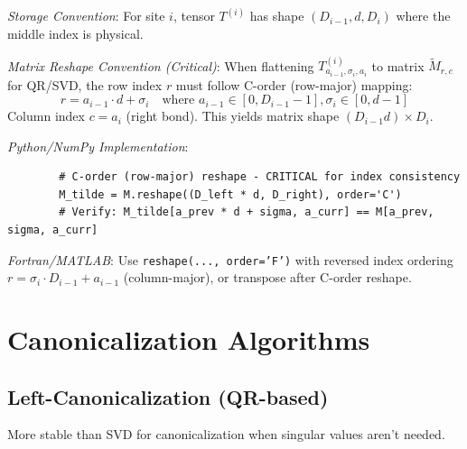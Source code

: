 \documentclass[aps,prb,onecolumn,scriptaddress]{revtex4-2}
\begin{document}
	\textit{Storage Convention}: For site $i$, tensor $T^{(i)}$ has shape $(D_{i-1}, d, D_i)$ where the middle index is physical.
	
	\textit{Matrix Reshape Convention (Critical)}: When flattening $T^{(i)}_{a_{i-1},\sigma_i,a_i}$ to matrix $\tilde{M}_{r,c}$ for QR/SVD, the row index $r$ must follow C-order (row-major) mapping:
	\begin{equation}
		r = a_{i-1} \cdot d + \sigma_i \quad \text{where } a_{i-1} \in [0,D_{i-1}-1], \sigma_i \in [0,d-1]
	\end{equation}
	Column index $c = a_i$ (right bond). This yields matrix shape $(D_{i-1}d) \times D_i$.
	
	\textit{Python/NumPy Implementation}:
	\begin{verbatim}
		# C-order (row-major) reshape - CRITICAL for index consistency
		M_tilde = M.reshape((D_left * d, D_right), order='C')
		# Verify: M_tilde[a_prev * d + sigma, a_curr] == M[a_prev, sigma, a_curr]
	\end{verbatim}
	\textit{Fortran/MATLAB}: Use \texttt{reshape(..., order='F')} with reversed index ordering $r = \sigma_i \cdot D_{i-1} + a_{i-1}$ (column-major), or transpose after C-order reshape.
	
	
	\section{Canonicalization Algorithms}
	
	\subsection{Left-Canonicalization (QR-based)}
	More stable than SVD for canonicalization when singular values aren't needed.
	
\end{document}
